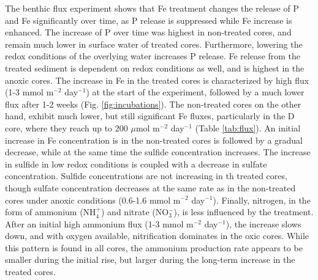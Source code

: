 \documentclass[a4paper,11pt]{article}
\begin{document}
The benthic flux experiment shows that Fe treatment changes the release of P and Fe significantly over time, as P release is suppressed while Fe increase is enhanced. The increase of P over time was highest in non-treated cores, and remain much lower in surface water of treated cores. Furthermore, lowering the redox conditions of the overlying water increases P release. Fe release from the treated sediment is dependent on redox conditions as well, and is highest in the anoxic cores. The increase in Fe in the treated cores is characterized by high flux (1-3 mmol m\(^{-2}\) day\(^{-1}\)) at the start of the experiment, followed by a much lower flux after 1-2 weeks (Fig. \ref{fig:incubations}). The non-treated cores on the other hand, exhibit much lower, but still significant Fe fluxes, particularly in the D core, where they reach up to 200 \(\mu\)mol m\(^{-2}\) day\(^{-1}\) (Table \ref{tab:flux}). An initial increase in Fe concentration is in the non-treated cores is followed by a gradual decrease, while at the same time the sulfide concentration increases. The increase in sulfide in low redox conditions is coupled with a decrease in sulfate concentration. Sulfide concentrations are not increasing in th treated cores, though sulfate concentration decreases at the same rate as in the non-treated cores under anoxic conditions (0.6-1.6 mmol m\(^{-2}\) day\(^{-1}\)). Finally, nitrogen, in the form of ammonium (NH\(_4^+\)) and nitrate (NO\(_3^-\)), is less influenced by the treatment. After an initial high ammonium flux (1-3 mmol m\(^{-2}\) day\(^{-1}\)), the increase slows down, and with oxygen available, nitrification dominates in the oxic cores. While this pattern is found in all cores, the ammonium production rate appears to be smaller during the initial rise, but larger during the long-term increase in the treated cores.
\end{document}
